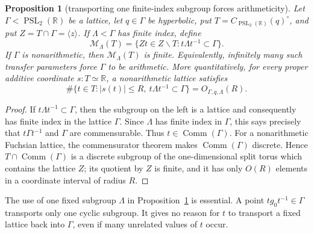 \documentclass[11pt,reqno]{amsart}
\newtheorem{proposition}[theorem]{Proposition}
\theoremstyle{definition}
\theoremstyle{remark}
\newcommand{\R}{\mathbb R}
\newcommand{\Comm}{\operatorname{Comm}}
\newcommand{\PSL}{\operatorname{PSL}}
\begin{document}
\begin{proposition}[transporting one finite-index subgroup forces arithmeticity]
\label{prop:marked-centralizer-commensurator}
Let \(\Gamma<\PSL_2(\R)\) be a lattice, let \(q\in\Gamma\) be hyperbolic,
put \(T=C_{\PSL_2(\R)}(q)^\circ\), and put
\(Z=T\cap\Gamma=\langle z\rangle\).  If \(\Lambda<\Gamma\) has finite
index, define
\[
 \mathcal M_\Lambda(T)=
 \{Zt\in Z\backslash T:t\Lambda t^{-1}\subset\Gamma\}.
\]
If \(\Gamma\) is nonarithmetic, then \(\mathcal M_\Lambda(T)\) is finite.
Equivalently, infinitely many such transfer parameters force
\(\Gamma\) to be arithmetic.  More quantitatively, for every proper
additive coordinate \(s:T\simeq\R\), a nonarithmetic lattice satisfies
\[
 \#\{t\in T:|s(t)|\le R,\ t\Lambda t^{-1}\subset\Gamma\}
 =O_{\Gamma,q,\Lambda}(R).
\tag{13.10a8}
\]
\end{proposition}

\begin{proof}
If \(t\Lambda t^{-1}\subset\Gamma\), then the subgroup on the left is a
lattice and consequently has finite index in the lattice \(\Gamma\).
Since \(\Lambda\) has finite index in \(\Gamma\), this says precisely that
\(t\Gamma t^{-1}\) and \(\Gamma\) are commensurable.  Thus
\(t\in\Comm(\Gamma)\).  For a nonarithmetic Fuchsian lattice, the
commensurator theorem makes \(\Comm(\Gamma)\) discrete.  Hence
\(T\cap\Comm(\Gamma)\) is a discrete subgroup of the one-dimensional
split torus which contains the lattice \(Z\); its quotient by \(Z\) is
finite, and it has only \(O(R)\) elements in a coordinate interval of
radius \(R\).
\end{proof}

The use of one fixed subgroup \(\Lambda\) in
Proposition~\ref{prop:marked-centralizer-commensurator} is essential.  A
point \(tg_0t^{-1}\in\Gamma\) transports only one cyclic
subgroup.  It gives no reason for \(t\) to transport a fixed lattice back
into \(\Gamma\), even if many unrelated values of \(t\) occur.
\end{document}
